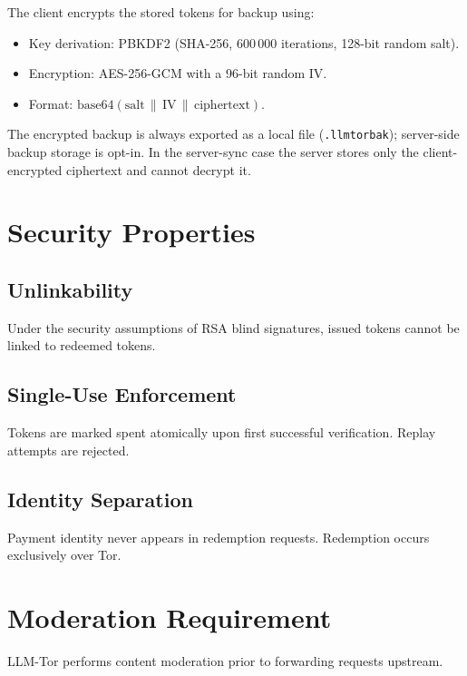 \documentclass[11pt,a4paper]{article}
\begin{document}
The client encrypts the stored tokens for backup using:
\begin{itemize}
  \item Key derivation: PBKDF2 (SHA-256, 600\,000 iterations, 128-bit random salt).
  \item Encryption: AES-256-GCM with a 96-bit random IV.
  \item Format: $\mathrm{base64}(\text{salt} \,\|\, \text{IV} \,\|\, \text{ciphertext})$.
\end{itemize}

The encrypted backup is always exported as a local file (\texttt{.llmtorbak}); server-side backup
storage is opt-in. In the server-sync case the server stores only the client-encrypted ciphertext and
cannot decrypt it.

\section{Security Properties}

\subsection{Unlinkability}

Under the security assumptions of RSA blind signatures, issued tokens cannot be linked to redeemed tokens.

\subsection{Single-Use Enforcement}

Tokens are marked spent atomically upon first successful verification. Replay attempts are rejected.

\subsection{Identity Separation}

Payment identity never appears in redemption requests. Redemption occurs exclusively over Tor.

\section{Moderation Requirement}

LLM-Tor performs content moderation prior to forwarding requests upstream.
\end{document}
